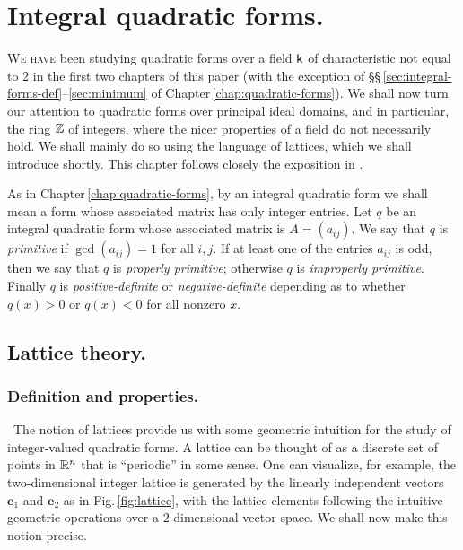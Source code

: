\chapter{Integral quadratic forms.}
\label{chap:integral-quadratic-forms}

{\scshape We have} been studying quadratic forms over a field \(\mathsf{k}\) of characteristic not equal to \(2\) in the first two chapters of this paper (with the exception of \S\S\,\ref{sec:integral-forms-def}--\ref{sec:minimum} of Chapter\,\ref{chap:quadratic-forms}). We shall now turn our attention to quadratic forms over principal ideal domains, and in particular, the ring \(\mathbb{Z}\) of integers, where the nicer properties of a field do not necessarily hold. We shall mainly do so using the language of lattices, which we shall introduce shortly. This chapter follows closely the exposition in \cite{cassels2008rational}.

As in Chapter\,\ref{chap:quadratic-forms}, by an integral quadratic form we shall mean a form whose associated matrix has only integer entries. Let \(q\) be an integral quadratic form whose associated matrix is \(A = (a_{ij})\). We say that \(q\) is \emph{primitive} if \(\gcd(a_{ij}) = 1\) for all \(i, j\). If at least one of the entries \(a_{ij}\) is odd, then we say that \(q\) is \emph{properly primitive}; otherwise \(q\) is \emph{improperly primitive}. Finally \(q\) is \emph{positive-definite} or \emph{negative-definite} depending as to whether \(q(x) > 0\) or \(q(x) < 0\) for all nonzero \(x\).

\section{Lattice theory.}

\subsection{Definition and properties.}~The notion of lattices provide us with some geometric intuition for the study of integer-valued quadratic forms. A lattice can be thought of as a discrete set of points in \(\mathbb{R}^n\) that is ``periodic'' in some sense. One can visualize, for example, the two-dimensional integer lattice is generated by the linearly independent vectors \(\mathbf{e}_1\) and \(\mathbf{e}_2\) as in Fig.\,\ref{fig:lattice}, with the lattice elements following the intuitive geometric operations over a \(2\)-dimensional vector space. We shall now make this notion precise.\label{sec:lattice-def}

